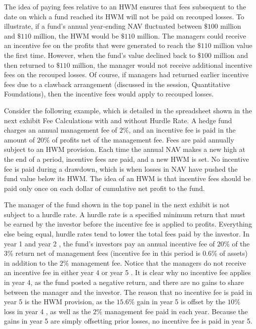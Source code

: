 \documentclass[11pt]{article}
\begin{document}
The idea of paying fees relative to an HWM ensures that fees subsequent to the date on which a fund reached its HWM will not be paid on recouped losses. To illustrate, if a fund's annual year-ending NAV fluctuated between $\$ 100$ million and $\$ 110$ million, the HWM would be $\$ 110$ million. The managers could receive an incentive fee on the profits that were generated to reach the $\$ 110$ million value the first time. However, when the fund's value declined back to $\$ 100$ million and then returned to $\$ 110$ million, the manager would not receive additional incentive fees on the recouped losses. Of course, if managers had returned earlier incentive fees due to a clawback arrangement (discussed in the session, Quantitative Foundations), then the incentive fees would apply to recouped losses.

Consider the following example, which is detailed in the spreadsheet shown in the next exhibit Fee Calculations with and without Hurdle Rate. A hedge fund charges an annual management fee of $2 \%$, and an incentive fee is paid in the amount of $20 \%$ of profits net of the management fee. Fees are paid annually subject to an HWM provision. Each time the annual NAV makes a new high at the end of a period, incentive fees are paid, and a new HWM is set. No incentive fee is paid during a drawdown, which is when losses in NAV have pushed the fund value below its HWM. The idea of an HWM is that incentive fees should be paid only once on each dollar of cumulative net profit to the fund.

The manager of the fund shown in the top panel in the next exhibit is not subject to a hurdle rate. A hurdle rate is a specified minimum return that must be earned by the investor before the incentive fee is applied to profits. Everything else being equal, hurdle rates tend to lower the total fees paid by the investor. In year 1 and year 2 , the fund's investors pay an annual incentive fee of $20 \%$ of the $3 \%$ return net of management fees (incentive fee in this period is $0.6 \%$ of assets) in addition to the $2 \%$ management fee. Notice that the managers do not receive an incentive fee in either year 4 or year 5 . It is clear why no incentive fee applies in year 4, as the fund posted a negative return, and there are no gains to share between the manager and the investor. The reason that no incentive fee is paid in year 5 is the HWM provision, as the $15.6 \%$ gain in year 5 is offset by the $10 \%$ loss in year 4 , as well as the $2 \%$ management fee paid in each year. Because the gains in year 5 are simply offsetting prior losses, no incentive fee is paid in year 5.
\end{document}
